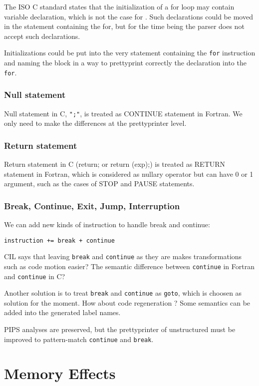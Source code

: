 \documentclass[a4paper]{report}
\begin{document}
The ISO C standard \cite{ISOC} states that the initialization of a for
loop may contain variable declaration, which is not the case for
\cite{Kern78}. Such declarations could be moved in the statement
containing the for, but for the time being the parser does not accept
such declarations.

Initializations could be put into the very statement containing the
\texttt{for} instruction and naming the block in a way to prettyprint
correctly the declaration into the \texttt{for}.

\subsection{Null statement}
Null statement in C, \verb/";"/, is treated as CONTINUE statement in
Fortran. We only need to make the differences at the prettyprinter
level.

\subsection{Return statement}
Return statement in C (return; or return (exp);) is treated as RETURN statement in Fortran, which is
considered as nullary operator but can have 0 or 1 argument, such as the
cases of STOP and PAUSE statements. 

\subsection{Break, Continue, Exit, Jump, Interruption}

We can add new kinds of instruction to handle break and continue: 

\verb/instruction += break + continue /

CIL says that leaving \verb/break/ and \verb/continue/ as they are
makes transformations such as code motion easier? The semantic
difference between \verb/continue/ in Fortran and \verb/continue/ in
C?

Another solution is to treat \verb/break/ and \verb/continue/ as
\verb/goto/, which is choosen as solution for the moment. How about code
regeneration ? Some semantics can be added into the generated label names.

PIPS analyses are preserved, but the prettyprinter of unstructured
must be improved to pattern-match \verb/continue/ and \verb/break/.

\chapter{Memory Effects}
\label{chapter:memory-effects}
\end{document}
